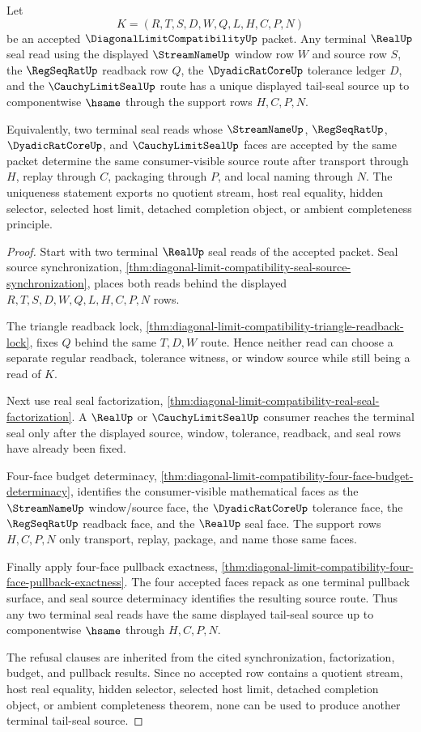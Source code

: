 \begin{theorem}
\label{thm:diagonal-limit-compatibility-tail-seal-source-uniqueness}
Let
$$
K=(R,T,S,D,W,Q,L,H,C,P,N)
$$
be an accepted $\DiagonalLimitCompatibilityUp$ packet. Any terminal
$\RealUp$ seal read using the displayed $\StreamNameUp$ window row $W$ and
source row $S$, the $\RegSeqRatUp$ readback row $Q$, the $\DyadicRatCoreUp$
tolerance ledger $D$, and the $\CauchyLimitSealUp$ route has a unique
displayed tail-seal source up to componentwise $\hsame$ through the support
rows $H,C,P,N$.

Equivalently, two terminal seal reads whose $\StreamNameUp$,
$\RegSeqRatUp$, $\DyadicRatCoreUp$, and $\CauchyLimitSealUp$ faces are
accepted by the same packet determine the same consumer-visible source route
after transport through $H$, replay through $C$, packaging through $P$, and
local naming through $N$. The uniqueness statement exports no quotient stream,
host real equality, hidden selector, selected host limit, detached completion
object, or ambient completeness principle.
\end{theorem}
\begin{proof}
Start with two terminal $\RealUp$ seal reads of the accepted packet. Seal
source synchronization,
\autoref{thm:diagonal-limit-compatibility-seal-source-synchronization},
places both reads behind the displayed $R,T,S,D,W,Q,L,H,C,P,N$ rows.

The triangle readback lock,
\autoref{thm:diagonal-limit-compatibility-triangle-readback-lock}, fixes
$Q$ behind the same $T,D,W$ route. Hence neither read can choose a separate
regular readback, tolerance witness, or window source while still being a
read of $K$.

Next use real seal factorization,
\autoref{thm:diagonal-limit-compatibility-real-seal-factorization}. A
$\RealUp$ or $\CauchyLimitSealUp$ consumer reaches the terminal seal only
after the displayed source, window, tolerance, readback, and seal rows have
already been fixed.

Four-face budget determinacy,
\autoref{thm:diagonal-limit-compatibility-four-face-budget-determinacy},
identifies the consumer-visible mathematical faces as the
$\StreamNameUp$ window/source face, the $\DyadicRatCoreUp$ tolerance face,
the $\RegSeqRatUp$ readback face, and the $\RealUp$ seal face. The support
rows $H,C,P,N$ only transport, replay, package, and name those same faces.

Finally apply four-face pullback exactness,
\autoref{thm:diagonal-limit-compatibility-four-face-pullback-exactness}.
The four accepted faces repack as one terminal pullback surface, and seal
source determinacy identifies the resulting source route. Thus any two
terminal seal reads have the same displayed tail-seal source up to
componentwise $\hsame$ through $H,C,P,N$.

The refusal clauses are inherited from the cited synchronization,
factorization, budget, and pullback results. Since no accepted row contains a
quotient stream, host real equality, hidden selector, selected host limit,
detached completion object, or ambient completeness theorem, none can be used
to produce another terminal tail-seal source.
\end{proof}
